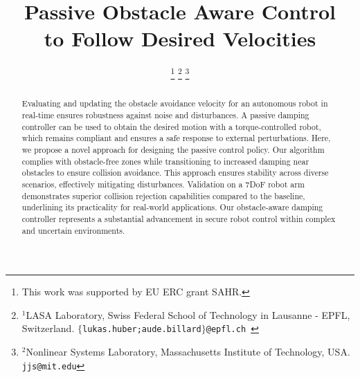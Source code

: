 \documentclass[conference]{IEEEtran}
\begin{document}
\newcommand{\vect}[1]{\boldsymbol{#1}}
\newcommand{\vecs}[1]{\boldsymbol{#1}}
\newcommand{\matr}[1]{\boldsymbol{#1}}
\newcommand{\matd}[1]{\mathcal{#1}}

\newcommand{\dotprod}[2]{\left\langle {#1}, \, {#2} \right\rangle}
\newcommand{\normdotprod}[2]{\frac{\left\langle #1, \, #2 \right\rangle}{\| #1 \| \, \| #2 \|}}


\newtheorem{theorem}{Theorem}[section]
\newtheorem{corollary}{Corollary}[section]
\newtheorem{lemma}{Lemma}[section]
\newtheorem{definition}{Definition}[section]

\newif\ifthesis
\thesisfalse

\title{
Passive Obstacle Aware Control \\
to Follow Desired Velocities
}

\author{
\thanks{This work was supported by EU ERC grant SAHR.} %
\thanks{$^{1}$LASA Laboratory, Swiss Federal School of Technology in Lausanne - EPFL, Switzerland. \tt $\{$lukas.huber;aude.billard$\}$@epfl.ch }
\thanks{$^{2}$Nonlinear Systems Laboratory,  Massachusetts Institute of Technology, USA. \tt jjs@mit.edu}   %
}


\maketitle
\thispagestyle{plain}
\pagestyle{plain}
    
\begin{abstract}
Evaluating and updating the obstacle avoidance velocity for an autonomous robot in real-time ensures robustness against noise and disturbances. A passive damping controller can be used to obtain the desired motion with a torque-controlled robot, which remains compliant and ensures a safe response to external perturbations.
Here, we propose a novel approach for designing the passive control policy. Our algorithm complies with obstacle-free zones while transitioning to increased damping near obstacles to ensure collision avoidance. This approach ensures stability across diverse scenarios, effectively mitigating disturbances.
Validation on a 7DoF robot arm demonstrates superior collision rejection capabilities compared to the baseline, underlining its practicality for real-world applications. 
Our obstacle-aware damping controller represents a substantial advancement in secure robot control within complex and uncertain environments.
\end{abstract}
\end{document}
